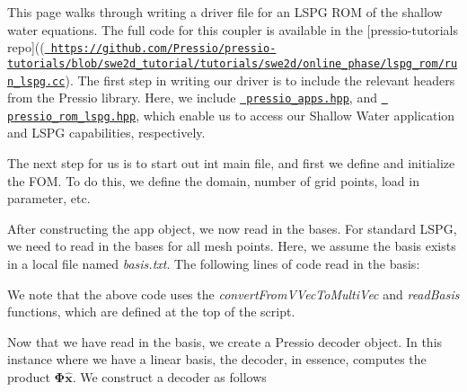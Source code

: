 This page walks through writing a driver file for an L\+S\+PG R\+OM of the shallow water equations. The full code for this coupler is available in the \mbox{[}pressio-\/tutorials repo\mbox{]}((\href{https://github.com/Pressio/pressio-tutorials/blob/swe2d_tutorial/tutorials/swe2d/online_phase/lspg_rom/run_lspg.cc}{\texttt{ https\+://github.\+com/\+Pressio/pressio-\/tutorials/blob/swe2d\+\_\+tutorial/tutorials/swe2d/online\+\_\+phase/lspg\+\_\+rom/run\+\_\+lspg.\+cc}}). The first step in writing our driver is to include the relevant headers from the Pressio library. Here, we include \href{https://github.com/Pressio/pressio/blob/master/packages/pressio_apps.hpp}{\texttt{ pressio\+\_\+apps.\+hpp}}, and \href{https://github.com/Pressio/pressio/blob/master/packages/pressio_lspg.hpp}{\texttt{ pressio\+\_\+rom\+\_\+lspg.\+hpp}}, which enable us to access our Shallow Water application and L\+S\+PG capabilities, respectively. 
\begin{DoxyCode}{0}
\end{DoxyCode}


The next step for us is to start out int main file, and first we define and initialize the F\+OM. To do this, we define the domain, number of grid points, load in parameter, etc.


\begin{DoxyCode}{0}
\end{DoxyCode}


After constructing the app object, we now read in the bases. For standard L\+S\+PG, we need to read in the bases for all mesh points. Here, we assume the basis exists in a local file named {\itshape basis.\+txt}. The following lines of code read in the basis\+:


\begin{DoxyCode}{0}
\end{DoxyCode}


We note that the above code uses the {\itshape convert\+From\+V\+Vec\+To\+Multi\+Vec} and {\itshape read\+Basis} functions, which are defined at the top of the script.

Now that we have read in the basis, we create a Pressio decoder object. In this instance where we have a linear basis, the decoder, in essence, computes the product $\boldsymbol \Phi \hat{\boldsymbol x} $. We construct a decoder as follows 
\begin{DoxyCode}{0}
\end{DoxyCode}



